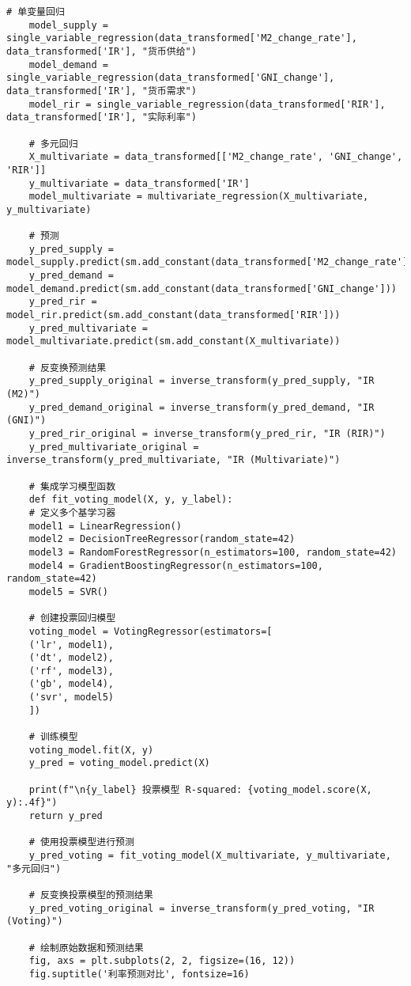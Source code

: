 \begin{lstlisting}[caption={问题二处理代码}]
	# 单变量回归
	model_supply = single_variable_regression(data_transformed['M2_change_rate'], data_transformed['IR'], "货币供给")
	model_demand = single_variable_regression(data_transformed['GNI_change'], data_transformed['IR'], "货币需求")
	model_rir = single_variable_regression(data_transformed['RIR'], data_transformed['IR'], "实际利率")
	
	# 多元回归
	X_multivariate = data_transformed[['M2_change_rate', 'GNI_change', 'RIR']]
	y_multivariate = data_transformed['IR']
	model_multivariate = multivariate_regression(X_multivariate, y_multivariate)
	
	# 预测
	y_pred_supply = model_supply.predict(sm.add_constant(data_transformed['M2_change_rate']))
	y_pred_demand = model_demand.predict(sm.add_constant(data_transformed['GNI_change']))
	y_pred_rir = model_rir.predict(sm.add_constant(data_transformed['RIR']))
	y_pred_multivariate = model_multivariate.predict(sm.add_constant(X_multivariate))
	
	# 反变换预测结果
	y_pred_supply_original = inverse_transform(y_pred_supply, "IR (M2)")
	y_pred_demand_original = inverse_transform(y_pred_demand, "IR (GNI)")
	y_pred_rir_original = inverse_transform(y_pred_rir, "IR (RIR)")
	y_pred_multivariate_original = inverse_transform(y_pred_multivariate, "IR (Multivariate)")
	
	# 集成学习模型函数
	def fit_voting_model(X, y, y_label):
	# 定义多个基学习器
	model1 = LinearRegression()
	model2 = DecisionTreeRegressor(random_state=42)
	model3 = RandomForestRegressor(n_estimators=100, random_state=42)
	model4 = GradientBoostingRegressor(n_estimators=100, random_state=42)
	model5 = SVR()
	
	# 创建投票回归模型
	voting_model = VotingRegressor(estimators=[
	('lr', model1),
	('dt', model2),
	('rf', model3),
	('gb', model4),
	('svr', model5)
	])
	
	# 训练模型
	voting_model.fit(X, y)
	y_pred = voting_model.predict(X)
	
	print(f"\n{y_label} 投票模型 R-squared: {voting_model.score(X, y):.4f}")
	return y_pred
	
	# 使用投票模型进行预测
	y_pred_voting = fit_voting_model(X_multivariate, y_multivariate, "多元回归")
	
	# 反变换投票模型的预测结果
	y_pred_voting_original = inverse_transform(y_pred_voting, "IR (Voting)")
	
	# 绘制原始数据和预测结果
	fig, axs = plt.subplots(2, 2, figsize=(16, 12))
	fig.suptitle('利率预测对比', fontsize=16)
	

\end{lstlisting}
